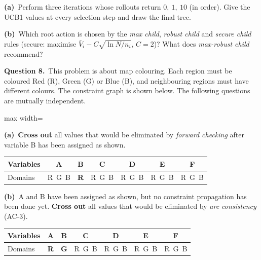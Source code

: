 \documentclass[11pt,a4paper]{article}
\newcommand{\question}[1]{\par\medskip\noindent\textbf{Question #1.}\ }
\newcommand{\subq}[1]{\par\smallskip\noindent\textbf{#1}\ }
\begin{document}
\subq{(a)}Perform three iterations whose rollouts return $0,\ 1,\ 10$ (in order). Give the UCB1 values at every selection step and draw the final tree.
\begin{ansbox}[height=9.0cm]\end{ansbox}
\subq{(b)}Which root action is chosen by the \emph{max child}, \emph{robust child} and \emph{secure child} rules (secure: maximise $\bar V_i-C\sqrt{\ln N/n_i}$, $C=2$)? What does \emph{max-robust child} recommend?
\begin{ansbox}[height=1.8cm]\end{ansbox}
\clearpage
\question{8}This problem is about map colouring. Each region must be coloured Red (R), Green (G) or Blue (B), and neighbouring regions must have different colours. The constraint graph is shown below. The following questions are mutually independent.\begin{center}
\begin{adjustbox}{max width=\linewidth}
\end{adjustbox}
\end{center}
\subq{(a)}\textbf{Cross out} all values that would be eliminated by \emph{forward checking} after variable B has been assigned as shown.\begin{center}\small\begin{tabular}{|l|c|c|c|c|c|c|}\hline Variables & \textbf{A} & \textbf{B} & \textbf{C} & \textbf{D} & \textbf{E} & \textbf{F}\\ \hline Domains & R\ G\ B & \textbf{R} & R\ G\ B & R\ G\ B & R\ G\ B & R\ G\ B\\ \hline\end{tabular}\end{center}

\subq{(b)}A and B have been assigned as shown, but no constraint propagation has been done yet. \textbf{Cross out} all values that would be eliminated by \emph{arc consistency} (AC-3).\begin{center}\small\begin{tabular}{|l|c|c|c|c|c|c|}\hline Variables & \textbf{A} & \textbf{B} & \textbf{C} & \textbf{D} & \textbf{E} & \textbf{F}\\ \hline Domains & \textbf{R} & \textbf{G} & R\ G\ B & R\ G\ B & R\ G\ B & R\ G\ B\\ \hline\end{tabular}\end{center}
\end{document}
